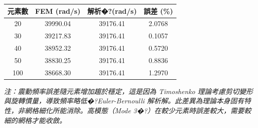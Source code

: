 \documentclass[UTF8, a4paper, 12pt]{ctexart}
\begin{document}
\begin{center}

\begin{tabular}{cccc}

\toprule

\textbf{元素數} & \textbf{FEM (rad/s)} & \textbf{解析�?(rad/s)} & \textbf{誤差 (\%)} \\

\midrule

20 & 39990.04 & 39176.41 & 2.0768 \\

30 & 39217.83 & 39176.41 & 0.1057 \\

40 & 38952.32 & 39176.41 & 0.5720 \\

50 & 38830.25 & 39176.41 & 0.8836 \\

100 & 38668.30 & 39176.41 & 1.2970 \\

\bottomrule

\end{tabular}

\end{center}



\textit{注：震動頻率誤差隨元素增加趨於穩定，這是因為 Timoshenko 理論考慮剪切變形與旋轉慣量，導致頻率略低�?Euler-Bernoulli 解析解。此差異為理論本身固有特性，非網格細化所能消除。高模態（Mode 3�?）在較少元素時誤差較大，需要較細的網格才能收斂。}
\end{document}

